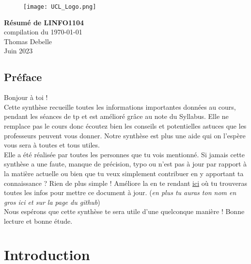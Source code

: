 \documentclass{report}
\begin{document}
\begin{titlepage}
    \begin{figure}
        \texttt{[image: UCL\_Logo.png]}
        \label{fig:my_label}
    \end{figure}

    \hspace*{100cm}
    \centering
    \vspace*{7cm}

    {\Huge \textbf{Résumé de LINFO1104}}\\
    \vspace*{0.25cm}
    compilation du \today\\
    \vspace*{0.25cm}
    \Large{Thomas Debelle}\\

    \vspace*{9.5cm}
    {\Large Juin 2023}
\end{titlepage}


\tableofcontents
\newpage

\section*{Préface}

Bonjour à toi !\\

Cette synthèse recueille toutes les informations importantes données au cours, pendant les séances de tp et est amélioré grâce au note du Syllabus. Elle ne remplace pas le cours donc écoutez bien les conseils et potentielles astuces que les professeurs peuvent vous donner. Notre synthèse est plus une aide qui on l'espère vous sera à toutes et tous utiles.\\

Elle a été réalisée par toutes les personnes que tu vois mentionné. Si jamais cette synthèse a une faute, manque de précision, typo ou n'est pas à jour par rapport à la matière actuelle ou bien que tu veux simplement contribuer en y apportant ta connaissance ? Rien de plus simple ! Améliore la en te rendant \href{http://www.github.com/Tfloow/Q4_EPL}{ici} où tu trouveras toutes les infos pour mettre ce document à jour. (\textit{en plus tu auras ton nom en gros ici et sur la page du github})\\

Nous espérons que cette synthèse te sera utile d'une quelconque manière ! Bonne lecture et bonne étude.


\chapter{Introduction}
\end{document}
